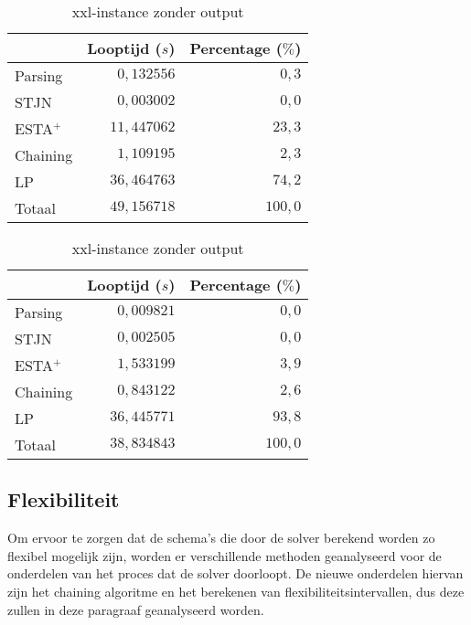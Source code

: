 \begin{table}[H]
\parbox{.45\linewidth}{
    \centering
    \begin{tabular}{| l | r | r |}
        \hline
                    & Looptijd ($s$)  & Percentage ($\%$) \\
        \hline
        Parsing     &  $0,132556$     & $0,3$   \\
        STJN        &  $0,003002$     & $0,0$   \\
        ESTA$^+$    & $11,447062$     & $23,3$  \\
        Chaining    &  $1,109195$     & $2,3$   \\
        LP          & $36,464763$     & $74,2$  \\
        \hline \hline
        Totaal      & $49,156718$     & $100,0$ \\
        \hline
    \end{tabular}
    \caption{xxl-instance met output}
    \label{tbl:xxl+output}
}
\hfill
\parbox{.45\linewidth}{
    \centering
    \begin{tabular}{| l | r | r |}
        \hline
                    & Looptijd ($s$)& Percentage ($\%$) \\
        \hline
        Parsing     &  $0,009821$      &  $0,0$  \\
        STJN        &  $0,002505$      &  $0,0$  \\
        ESTA$^+$    &  $1,533199$      &  $3,9$  \\
        Chaining    &  $0,843122$      &  $2,6$  \\
        LP          & $36,445771$      & $93,8$  \\
        \hline \hline
        Totaal      & $38,834843$      & $100,0$ \\
        \hline
    \end{tabular}
    \caption{xxl-instance zonder output}
    \label{tbl:xxl-output}
}
\end{table}

\subsection{Flexibiliteit}
Om ervoor te zorgen dat de schema's die door de solver berekend worden zo flexibel mogelijk zijn, worden er verschillende methoden geanalyseerd voor de onderdelen van het proces dat de solver doorloopt. De nieuwe onderdelen hiervan zijn het chaining algoritme en het berekenen van flexibiliteitsintervallen, dus deze zullen in deze paragraaf geanalyseerd worden. 

